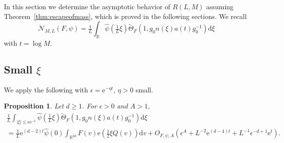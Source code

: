 \documentclass[12pt]{amsart}
\newtheorem{prop}[thm]{Proposition}
\theoremstyle{definition}
\theoremstyle{remark}
\numberwithin{equation}{section}
\newcommand{\dd}{\mathrm{d}}
\newcommand{\R}{\mathbb{R}}
\newcommand{\e}{\mathrm{e}}
\newcommand{\cN}{\mathcal{N}}
\begin{document}
In this section we determine the asymptotic behavior of $R(L,M)$ assuming Theorem~\ref{thm:escapeofmass}, which is proved in the following sections.
We recall
\begin{equation}
  \label{eq:RLMtheta}
  \cN_{M,L}(F,\psi)  = \tfrac{1}{L} \int_{\R} \hat{\psi}(\tfrac{1}{L} \xi) \widetilde\Theta_F(1, g_0 n(\xi) a(t) g_0^{-1}) \dd \xi
\end{equation}
with $t = \log M$. 


\subsection{Small $\xi$}
\label{sec:smallxi}

We apply the following with $\epsilon = \e^{-\eta t}$, $\eta > 0$ small.
\begin{prop}
Let $d\geq 1$. For $\epsilon>0$ and $A > 1$,
\begin{multline}\label{lemX1}
 \tfrac{1}{L} \int_{|\xi|\leq \epsilon \e^{-t}} \hat{\psi} ( \tfrac{1}{L}\xi ) \widetilde\Theta_F(1, g_0 n(\xi) a(t) g_0^{-1}) \dd \xi \\
= \tfrac{1}{L} \e^{(d-2)t} \hat \psi(0) \int_{\mathbb{R}^{2d}} F(v) \e( \tfrac{1}{2} \xi Q(v) ) \dd v
+ O_{F,\psi, A}(\epsilon^{A} + L^{-2} \e^{(d-4)t} + L^{-1} \epsilon^{-d + 1} \e^t) .
\end{multline}
\end{prop}
\end{document}
